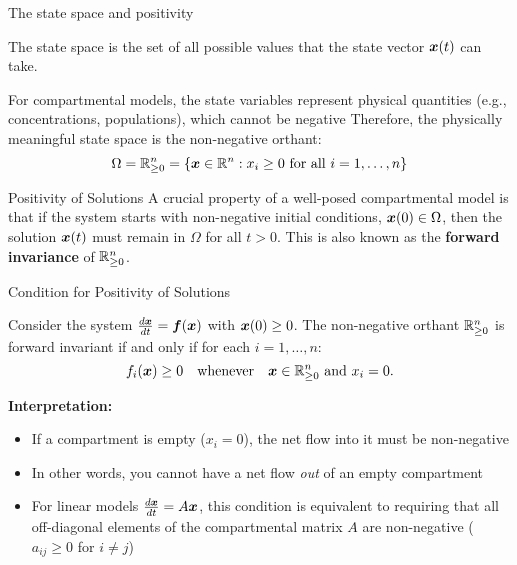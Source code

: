 \documentclass[aspectratio=169]{beamer}\usepackage[]{graphicx}\usepackage[]{xcolor}
\begin{document}
\begin{frame}{The state space and positivity}
    \begin{definition}
        The state space is the set of all possible values that the state vector $\bm{x}(t)$ can take.
    \end{definition}
    \vfill
    For compartmental models, the state variables represent physical quantities (e.g., concentrations, populations), which cannot be negative
    \vfill
    Therefore, the physically meaningful state space is the non-negative orthant:
    $$ \Omega = \mathbb{R}_{\ge 0}^n = \{ \bm{x} \in \mathbb{R}^n : x_i \ge 0 \text{ for all } i=1, \dots, n \} $$
    \vfill
    \begin{block}{Positivity of Solutions}
        A crucial property of a well-posed compartmental model is that if the system starts with non-negative initial conditions, $\bm{x}(0) \in \Omega$, then the solution $\bm{x}(t)$ must remain in $\Omega$ for all $t > 0$. This is also known as the \textbf{forward invariance} of $\mathbb{R}_{\ge 0}^n$.
    \end{block}
\end{frame}

\begin{frame}{Condition for Positivity of Solutions}
    \begin{theorem}
        Consider the system $\frac{d\bm{x}}{dt} = \bm{f}(\bm{x})$ with $\bm{x}(0) \ge 0$. The non-negative orthant $\mathbb{R}_{\ge 0}^n$ is forward invariant if and only if for each $i=1, \dots, n$:
        $$ f_i(\bm{x}) \ge 0 \quad \text{whenever} \quad \bm{x} \in \mathbb{R}_{\ge 0}^n \text{ and } x_i=0. $$
    \end{theorem}
    \vfill
    \textbf{Interpretation:}
    \begin{itemize}
        \item If a compartment is empty ($x_i=0$), the net flow into it must be non-negative
        \item In other words, you cannot have a net flow \textit{out} of an empty compartment
        \item For linear models $\frac{d\bm{x}}{dt} = A\bm{x}$, this condition is equivalent to requiring that all off-diagonal elements of the compartmental matrix $A$ are non-negative ($a_{ij} \ge 0$ for $i \neq j$)
    \end{itemize}
\end{frame}
\end{document}
